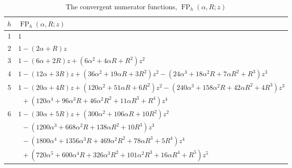 \documentclass[12pt,reqno]{article}
\numberwithin{sfootnote}{section}
\newcommand{\subtablewidth}{\textwidth}
\newcommand{\subtableskip}{\bigskip}
\newcommand{\tabletopstrut}[0]{\rule{0pt}{3ex}}
\newcommand{\tablebottomstrut}[0]{\rule{0pt}{3ex}}
\numberwithin{equation}{section}
\theoremstyle{DefaultTheoremStyle}
\theoremstyle{definition}
\newcommand{\ConvFP}[4]{\ensuremath{\FP_{#1}\left(#2, #3; #4\right)}}
\DeclareMathOperator{\FP}{FP}
\begin{document}
\begin{table}[h] 

\smaller 
\centering 

\begin{subtable}{\subtablewidth} 
\centering 

\begin{tabular}{|c|l|} \hline 
\hline\tabletopstrut  
$h$ & $\ConvFP{h}{\alpha}{R}{z}$ \tablebottomstrut \\ \hline 
1 & $1$ \\ 
2 & $1 - (2\alpha+R)z$ \\ 
3 & $1 - (6\alpha+2R)z + (6\alpha^2+4\alpha R+R^2)z^2$ \\ 
4 & $1 - (12\alpha+3R)z + (36\alpha^2+19\alpha R+3R^2)z^2 - 
           (24\alpha^3 + 18\alpha^2R + 7\alpha R^2 + R^3) z^3$ \\ 
5 & $1 - (20 \alpha + 4 R) z + (120 \alpha^2 + 51 \alpha R + 6 R^2) z^2 - 
     (240 \alpha^3 + 158 \alpha^2 R + 42 \alpha R^2 + 4 R^3) z^3$ \\ 
  & $\phantom{1} + 
     (120 \alpha^4 + 96 \alpha^3 R + 46 \alpha^2 R^2 + 11 \alpha R^3 + R^4) z^4$ \\ 
6 & $1 - (30 \alpha + 5 R) z + (300 \alpha^2 + 106 \alpha R + 10 R^2) z^2$ \\ 
  & $\phantom{1} - 
     (1200 \alpha^3 + 668 \alpha^2 R + 138 \alpha R^2 + 10 R^3) z^3$ \\ 
   & $\phantom{1} - 
     (1800 \alpha^4 + 1356 \alpha^3 R + 469 \alpha^2 R^2 + 78 \alpha R^3 + 5 R^4) z^4$ \\ 
   & $\phantom{1} + 
     (720 \alpha^5 + 600 \alpha^4 R + 326 \alpha^3 R^2 + 101 \alpha^2 R^3 + 16 \alpha R^4 + R^5) z^5$ \\ \hline 
\hline 
\end{tabular} 
\caption{The convergent numerator functions, $\ConvFP{h}{\alpha}{R}{z}$} 

\subtableskip 


\end{subtable}
\end{table}
\end{document}
